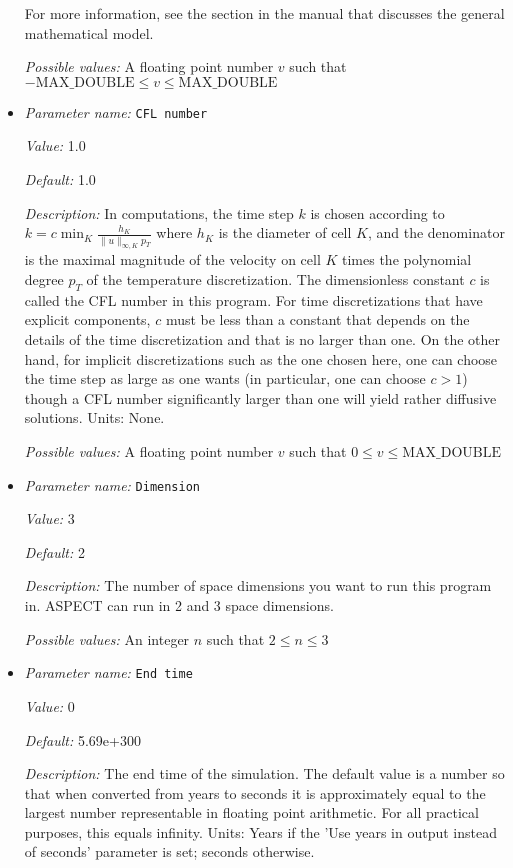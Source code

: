 \begin{itemize}
For more information, see the section in the manual that discusses the general mathematical model.


{\it Possible values:} A floating point number $v$ such that $-\text{MAX\_DOUBLE} \leq v \leq \text{MAX\_DOUBLE}$
\item {\it Parameter name:} {\tt CFL number}
\label{parameters:CFL number}
\label{parameters:CFL_20number}


{\it Value:} 1.0


{\it Default:} 1.0


{\it Description:} In computations, the time step $k$ is chosen according to $k = c \min_K \frac {h_K} {\|u\|_{\infty,K} p_T}$ where $h_K$ is the diameter of cell $K$, and the denominator is the maximal magnitude of the velocity on cell $K$ times the polynomial degree $p_T$ of the temperature discretization. The dimensionless constant $c$ is called the CFL number in this program. For time discretizations that have explicit components, $c$ must be less than a constant that depends on the details of the time discretization and that is no larger than one. On the other hand, for implicit discretizations such as the one chosen here, one can choose the time step as large as one wants (in particular, one can choose $c>1$) though a CFL number significantly larger than one will yield rather diffusive solutions. Units: None.


{\it Possible values:} A floating point number $v$ such that $0 \leq v \leq \text{MAX\_DOUBLE}$
\item {\it Parameter name:} {\tt Dimension}
\label{parameters:Dimension}


{\it Value:} 3


{\it Default:} 2


{\it Description:} The number of space dimensions you want to run this program in. ASPECT can run in 2 and 3 space dimensions.


{\it Possible values:} An integer $n$ such that $2\leq n \leq 3$
\item {\it Parameter name:} {\tt End time}
\label{parameters:End time}
\label{parameters:End_20time}


{\it Value:} 0


{\it Default:} 5.69e+300


{\it Description:} The end time of the simulation. The default value is a number so that when converted from years to seconds it is approximately equal to the largest number representable in floating point arithmetic. For all practical purposes, this equals infinity. Units: Years if the 'Use years in output instead of seconds' parameter is set; seconds otherwise.



\end{itemize}
